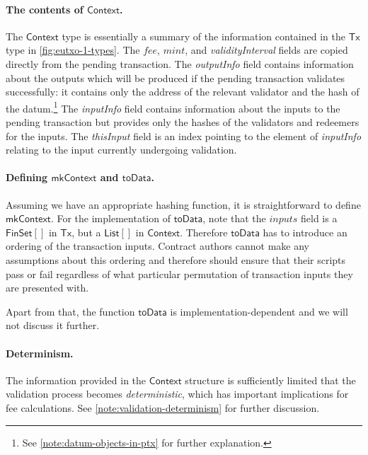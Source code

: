 \documentclass[a4paper]{article}
\newcounter{note}
\renewcommand{\i}{\textit}  %
\newcommand{\s}{\textsf}  %
\newcommand{\msf}[1]{\ensuremath{\mathsf{#1}}}
\newcommand{\mi}[1]{\ensuremath{\mathit{#1}}}
\newcommand{\List}[1]{\ensuremath{\s{List}[#1]}}
\newcommand{\FinSet}[1]{\ensuremath{\s{FinSet}[#1]}}
\newcommand{\ctx}{\ensuremath{\s{Context}}}
\newcommand{\toData}{\ensuremath{\s{toData}}}
\newcommand{\mkContext}{\ensuremath{\s{mkContext}}}
\newcommand{\mint}{\mi{mint}}
\newcommand{\fee}{\mi{fee}}
\newcommand{\eutxotx}{\msf{Tx}}
\begin{document}
\paragraph{The contents of \ctx{}.}
The \ctx{} type is essentially a summary of the information contained
in the $\eutxotx$ type in \cref{fig:eutxo-1-types}. The \fee{},
\mint{}, and \i{validityInterval} fields are copied directly from the
pending transaction.  The \i{outputInfo} field contains information
about the outputs which will be produced if the pending transaction
validates successfully: it contains only the address of the relevant
validator and the hash of the datum.\footnote{See
  \cref{note:datum-objects-in-ptx} for further explanation.}  The
\i{inputInfo} field contains information about the inputs to the
pending transaction but provides only the hashes of the validators
and redeemers for the inputs.  The \i{thisInput} field
is an index pointing to the element of \i{inputInfo} relating to the
input currently undergoing validation.

\paragraph{Defining \mkContext{} and \toData.}
Assuming we have an
appropriate hashing function, it is straightforward to define \mkContext.
For the implementation of \toData, note that the $inputs$ field is a
\FinSet{} in \eutxotx{}, but a \List{} in \ctx{}. Therefore \toData{} has to introduce
an ordering of the transaction inputs. Contract authors cannot make
any assumptions about this ordering and therefore should ensure that
their scripts pass or fail regardless of what particular permutation
of transaction inputs they are presented with.

Apart from that, the function \toData{} is implementation-dependent and
we will not discuss it further.

\paragraph{Determinism.}
The information provided in the \ctx{}
structure is sufficiently limited that the validation process
becomes \textit{deterministic},  which has important implications
for fee calculations.  See \cref{note:validation-determinism}
for further discussion.
\end{document}
